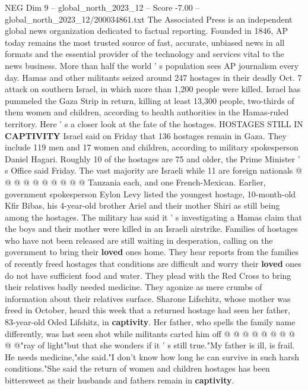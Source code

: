 \begin{textsample}{NEG Dim 9 – global\_north\_2023\_12 – Score -7.00 – global\_north\_2023\_12/200034861.txt}  \label{ex:f9_neg_079}
The Associated Press is an independent global news organization dedicated to factual reporting.
Founded in 1846, AP today remains the most trusted source of fast, accurate, unbiased news in all formats and the essential provider of the technology and services vital to the news business.
More than half the world ' s population sees AP journalism every day.
Hamas and other militants seized around 247 hostages in their deadly Oct. 7 attack on southern Israel, in which more than 1,200 people were killed.
Israel has pummeled the Gaza Strip in return, killing at least 13,300 people, two-thirds of them women and children, according to health authorities in the Hamas-ruled territory.
Here ' s a closer look at the fate of the hostages.
HOSTAGES STILL IN \textbf{CAPTIVITY} Israel said on Friday that 136 hostages remain in Gaza.
They include 119 men and 17 women and children, according to military spokesperson Daniel Hagari.
Roughly 10 of the hostages are 75 and older, the Prime Minister ' s Office said Friday.
The vast majority are Israeli while 11 are foreign nationals @ @ @ @ @ @ @ @ @ @ Tanzania each, and one French-Mexican.
Earlier, government spokesperson Eylon Levy listed the youngest hostage, 10-month-old Kfir Bibas, his 4-year-old brother Ariel and their mother Shiri as still being among the hostages.
The military has said it ' s investigating a Hamas claim that the boys and their mother were killed in an Israeli airstrike.
Families of hostages who have not been released are still waiting in desperation, calling on the government to bring their \textbf{loved} ones home.
They hear reports from the families of recently freed hostages that conditions are difficult and worry their \textbf{loved} ones do not have sufficient food and water.
They plead with the Red Cross to bring their relatives badly needed medicine.
They agonize as mere crumbs of information about their relatives surface.
Sharone Lifschitz, whose mother was freed in October, heard this week that a returned hostage had seen her father, 83-year-old Oded Lifshitz, in \textbf{captivity}.
Her father, who spells the family name differently, was last seen shot while militants carted him off @ @ @ @ @ @ @ @ @ @"ray of light"but that she wonders if it ' s still true."My father is ill, is frail.
He needs medicine,"she said."I don't know how long he can survive in such harsh conditions."She said the return of women and children hostages has been bittersweet as their husbands and fathers remain in \textbf{captivity}.

\end{textsample}
